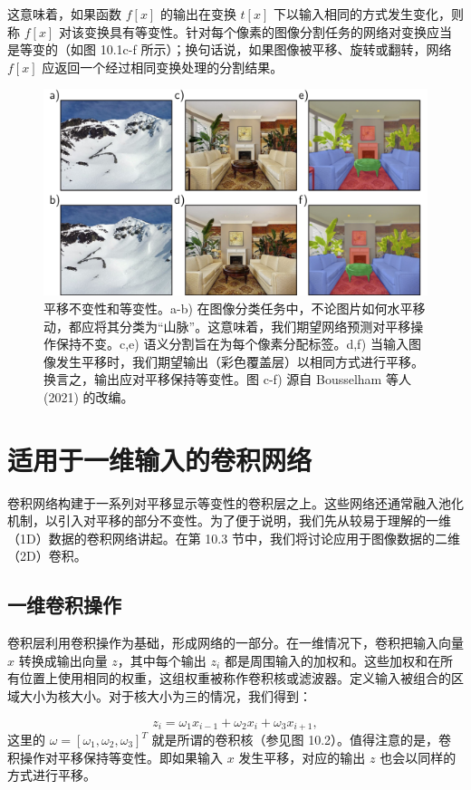 这意味着，如果函数 \(f[x]\) 的输出在变换 \(t[x]\) 下以输入相同的方式发生变化，则称 \(f[x]\) 对该变换具有等变性。针对每个像素的图像分割任务的网络对变换应当是等变的（如图 10.1c-f 所示）；换句话说，如果图像被平移、旋转或翻转，网络 \(f[x]\) 应返回一个经过相同变换处理的分割结果。

\begin{figure}[ht!]
\centering
\includegraphics[width=0.7\linewidth]{png/chapter10/ConvEquiInv.png}
\caption{平移不变性和等变性。a-b) 在图像分类任务中，不论图片如何水平移动，都应将其分类为“山脉”。这意味着，我们期望网络预测对平移操作保持不变。c,e) 语义分割旨在为每个像素分配标签。d,f) 当输入图像发生平移时，我们期望输出（彩色覆盖层）以相同方式进行平移。换言之，输出应对平移保持等变性。图 c-f) 源自 Bousselham 等人 (2021) 的改编。}
\end{figure}


\section{适用于一维输入的卷积网络}
卷积网络构建于一系列对平移显示等变性的卷积层之上。这些网络还通常融入池化机制，以引入对平移的部分不变性。为了便于说明，我们先从较易于理解的一维（1D）数据的卷积网络讲起。在第 10.3 节中，我们将讨论应用于图像数据的二维（2D）卷积。

\subsection{一维卷积操作}
卷积层利用卷积操作为基础，形成网络的一部分。在一维情况下，卷积把输入向量 \(x\) 转换成输出向量 \(z\)，其中每个输出 \(z_i\) 都是周围输入的加权和。这些加权和在所有位置上使用相同的权重，这组权重被称作卷积核或滤波器。定义输入被组合的区域大小为核大小。对于核大小为三的情况，我们得到：

\begin{equation}
z_i = \omega_1 x_{i-1} + \omega_2 x_i + \omega_3 x_{i+1}, 
\end{equation}
这里的 \(\omega = [\omega_1, \omega_2, \omega_3]^T\) 就是所谓的卷积核（参见图 10.2）。值得注意的是，卷积操作对平移保持等变性。即如果输入 \(x\) 发生平移，对应的输出 \(z\) 也会以同样的方式进行平移。



